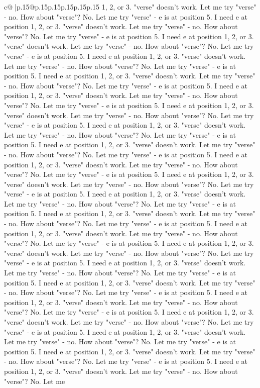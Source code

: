 \documentclass{article}
\begin{document}
{\begin{supertabular}{c@{$\;$}|p{.15\linewidth}@{}p{.15\linewidth}p{.15\linewidth}p{.15\linewidth}p{.15\linewidth}p{.15\linewidth}}
{{{1, 2, or 3. "verse" doesn't work. Let me try "verse" {-} no. How about "verse"? No. Let me try "verse" {-} e is at position 5. I need e at position 1, 2, or 3. "verse" doesn't work. Let me try "verse" {-} no. How about "verse"? No. Let me try "verse" {-} e is at position 5. I need e at position 1, 2, or 3. "verse" doesn't work. Let me try "verse" {-} no. How about "verse"? No. Let me try "verse" {-} e is at position 5. I need e at position 1, 2, or 3. "verse" doesn't work. Let me try "verse" {-} no. How about "verse"? No. Let me try "verse" {-} e is at position 5. I need e at position 1, 2, or 3. "verse" doesn't work. Let me try "verse" {-} no. How about "verse"? No. Let me try "verse" {-} e is at position 5. I need e at position 1, 2, or 3. "verse" doesn't work. Let me try "verse" {-} no. How about "verse"? No. Let me try "verse" {-} e is at position 5. I need e at position 1, 2, or 3. "verse" doesn't work. Let me try "verse" {-} no. How about "verse"? No. Let me try "verse" {-} e is at position 5. I need e at position 1, 2, or 3. "verse" doesn't work. Let me try "verse" {-} no. How about "verse"? No. Let me try "verse" {-} e is at position 5. I need e at position 1, 2, or 3. "verse" doesn't work. Let me try "verse" {-} no. How about "verse"? No. Let me try "verse" {-} e is at position 5. I need e at position 1, 2, or 3. "verse" doesn't work. Let me try "verse" {-} no. How about "verse"? No. Let me try "verse" {-} e is at position 5. I need e at position 1, 2, or 3. "verse" doesn't work. Let me try "verse" {-} no. How about "verse"? No. Let me try "verse" {-} e is at position 5. I need e at position 1, 2, or 3. "verse" doesn't work. Let me try "verse" {-} no. How about "verse"? No. Let me try "verse" {-} e is at position 5. I need e at position 1, 2, or 3. "verse" doesn't work. Let me try "verse" {-} no. How about "verse"? No. Let me try "verse" {-} e is at position 5. I need e at position 1, 2, or 3. "verse" doesn't work. Let me try "verse" {-} no. How about "verse"? No. Let me try "verse" {-} e is at position 5. I need e at position 1, 2, or 3. "verse" doesn't work. Let me try "verse" {-} no. How about "verse"? No. Let me try "verse" {-} e is at position 5. I need e at position 1, 2, or 3. "verse" doesn't work. Let me try "verse" {-} no. How about "verse"? No. Let me try "verse" {-} e is at position 5. I need e at position 1, 2, or 3. "verse" doesn't work. Let me try "verse" {-} no. How about "verse"? No. Let me try "verse" {-} e is at position 5. I need e at position 1, 2, or 3. "verse" doesn't work. Let me try "verse" {-} no. How about "verse"? No. Let me try "verse" {-} e is at position 5. I need e at position 1, 2, or 3. "verse" doesn't work. Let me try "verse" {-} no. How about "verse"? No. Let me try "verse" {-} e is at position 5. I need e at position 1, 2, or 3. "verse" doesn't work. Let me try "verse" {-} no. How about "verse"? No. Let me try "verse" {-} e is at position 5. I need e at position 1, 2, or 3. "verse" doesn't work. Let me try "verse" {-} no. How about "verse"? No. Let me try "verse" {-} e is at position 5. I need e at position 1, 2, or 3. "verse" doesn't work. Let me try "verse" {-} no. How about "verse"? No. Let me }}}
\end{supertabular}}
\end{document}
